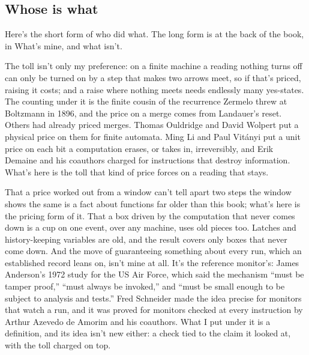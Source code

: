 \documentclass[11pt,twoside]{article}
\theoremstyle{thielethm}
\theoremstyle{thieledef}
\theoremstyle{thieledef}
\theoremstyle{thieledef}
\theoremstyle{thielethm}
\theoremstyle{thieleobs}
\theoremstyle{thielethm}
\begin{document}
\subsection{Whose is what}

Here's the short form of who did what. The long form is at the back of the book, in What's mine, and what isn't.

The toll isn't only my preference: on a finite machine a reading nothing turns off can only be turned on by a step that makes two arrows meet, so if that's priced, raising it costs; and a raise where nothing meets needs endlessly many yes-states. The counting under it is the finite cousin of the recurrence Zermelo threw at Boltzmann in 1896, and the price on a merge comes from Landauer's reset. Others had already priced merges. Thomas Ouldridge and David Wolpert put a physical price on them for finite automata. Ming Li and Paul Vitányi put a unit price on each bit a computation erases, or takes in, irreversibly, and Erik Demaine and his coauthors charged for instructions that destroy information. What's here is the toll that kind of price forces on a reading that stays.

That a price worked out from a window can't tell apart two steps the window shows the same is a fact about functions far older than this book; what's here is the pricing form of it. That a box driven by the computation that never comes down is a cup on one event, over any machine, uses old pieces too. Latches and history-keeping variables are old, and the result covers only boxes that never come down. And the move of guaranteeing something about every run, which an established record leans on, isn't mine at all. It's the reference monitor's: James Anderson's 1972 study for the US Air Force, which said the mechanism ``must be tamper proof,'' ``must always be invoked,'' and ``must be small enough to be subject to analysis and tests.'' Fred Schneider made the idea precise for monitors that watch a run, and it was proved for monitors checked at every instruction by Arthur Azevedo de Amorim and his coauthors. What I put under it is a definition, and its idea isn't new either: a check tied to the claim it looked at, with the toll charged on top.
\end{document}
